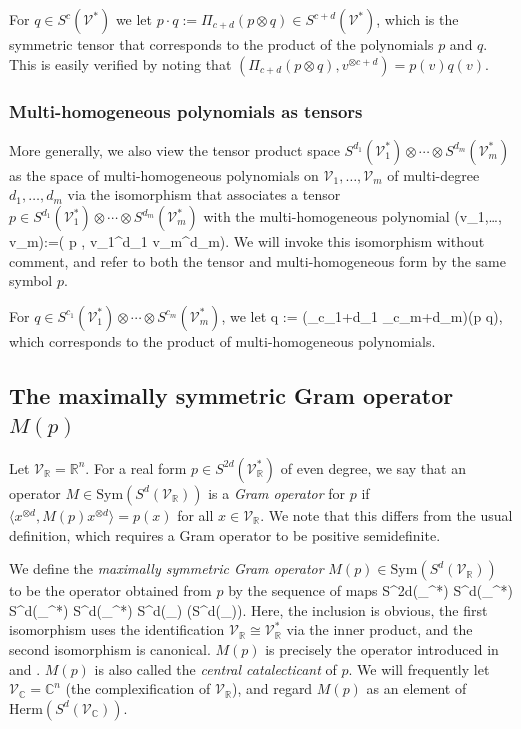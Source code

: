 \documentclass[11pt]{article}
\numberwithin{theorem}{section}
\theoremstyle{definition}
\newcommand{\ip}[2]{\langle #1 , #2\rangle}
\newcommand{\bip}[2]{( #1 , #2)}
\newcommand{\setft}[1]{\mathrm{#1}}
\newcommand{\Herm}{\setft{Herm}}
\newcommand{\Sym}{\setft{Sym}}
\newcommand{\complex}{\mathbb{C}}
\newcommand{\real}{\mathbb{R}}
\newcommand\V{\mathcal{V}}
\newcommand\U{\mathcal{U}}
\newcommand{\End}{\setft{End}}
\newcommand{\ootimes}{ \otimes \cdots \otimes }
\newcommand{\injects}{\hookrightarrow}
\def\ba#1\ea{\begin{align}#1\end{align}}
\newcommand{\Vc}{\V_{\complex}}
\newcommand{\Vr}{\V_{\real}}
\begin{document}
For $q \in S^c(\V^*)$ we let $p \cdot q := \Pi_{c+d}(p\otimes q) \in S^{c+d}(\V^*)$, which is the symmetric tensor that corresponds to the product of the polynomials $p$ and $q$. This is easily verified by noting that $(\Pi_{c+d}(p\otimes q), v^{\otimes {c+d}})=p(v) q(v)$.

\subsubsection*{Multi-homogeneous polynomials as tensors}

More generally, we also view the tensor product space $S^{d_1}(\V_1^*)\ootimes S^{d_m}(\V_m^*)$ as the space of multi-homogeneous polynomials on $\V_1,\dots, \V_m$ of multi-degree $d_1,\dots, d_m$ via the isomorphism that associates a tensor  $p \in S^{d_1}(\V_1^*)\ootimes S^{d_m}(\V_m^*)$ with the multi-homogeneous polynomial
\ba
p(v_1,\dots, v_m):=\bip{p}{v_1^{\otimes d_1}\ootimes v_m^{\otimes d_m}}.
\ea
We will invoke this isomorphism without comment, and refer to both the tensor and multi-homogeneous form by the same symbol $p$.

For $q \in S^{c_1}(\V_1^*)\ootimes S^{c_m}(\V_m^*)$, we let
\ba
p \cdot q := (\Pi_{c_1+d_1} \ootimes \Pi_{c_m+d_m})(p \otimes q),
\ea
which corresponds to the product of multi-homogeneous polynomials. 






\subsection{The maximally symmetric Gram operator $M(p)$}

Let $\Vr=\real^n$. For a real form $p \in S^{2d}(\Vr^*)$ of even degree, we say that an operator $M \in \Sym(S^d(\Vr))$ is a \textit{Gram operator} for $p$ if $\ip{x^{\otimes d}}{M(p)x^{\otimes d}}=p(x)$ for all $x \in \Vr$. We note that this differs from the usual definition, which requires a Gram operator to be positive semidefinite.

We define the \textit{maximally symmetric Gram operator} $M(p) \in \Sym(S^d(\Vr))$ to be the operator obtained from $p$ by the sequence of maps
\ba\label{eq:injects}
S^{2d}(\Vr^*) \injects S^d(\Vr^*) \otimes S^d(\Vr^*) \cong S^d(\Vr^*) \otimes S^d(\Vr) \cong \End(S^d(\Vr)).
\ea
Here, the inclusion is obvious, the first isomorphism uses the identification $\Vr \cong \Vr^*$ via the inner product, and the second isomorphism is canonical. $M(p)$ is precisely the operator introduced in~\cite[Section 3]{doherty2012convergence} and \cite[Lemma 1.2]{laurent2019notes}. $M(p)$ is also called the \textit{central catalecticant} of $p$. We will frequently let $\Vc=\complex^n$ (the complexification of $\Vr$), and regard $M(p)$ as an element of $\Herm(S^d(\Vc))$.
\end{document}
